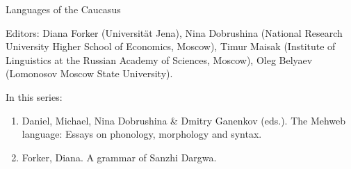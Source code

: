 {\large Languages of the Caucasus}

\bigskip
 
Editors:        Diana Forker (Universität Jena),
    Nina Dobrushina (National Research University Higher School of Economics, Moscow),
    Timur Maisak (Institute of Linguistics at the Russian Academy of Sciences, Moscow),
    Oleg Belyaev (Lomonosov Moscow State University).

\bigskip

In this series:

\begin{enumerate}
\item Daniel, Michael, Nina Dobrushina \& Dmitry Ganenkov (eds.). The Mehweb
language: Essays on phonology, morphology and syntax.
\item Forker, Diana. A grammar of Sanzhi Dargwa.
\end{enumerate}
 
